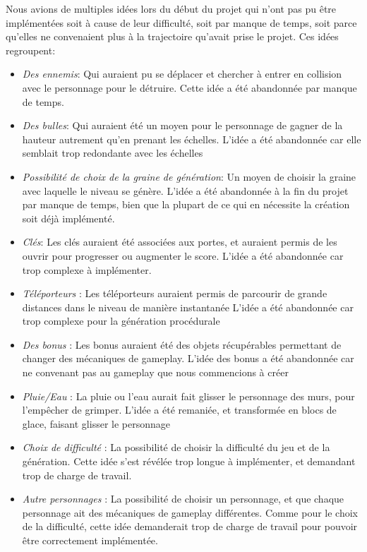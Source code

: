 \documentclass[10pt]{report}
\begin{document}
Nous avions de multiples idées lors du début du projet qui n'ont pas pu être implémentées soit à cause de leur
difficulté, soit par manque de temps, soit parce qu'elles ne convenaient plus  à la trajectoire qu'avait prise le projet.
Ces idées regroupent:
\begin{itemize}
  \item \emph{Des ennemis}: Qui auraient pu se déplacer et chercher à entrer en collision avec le personnage pour le détruire.
        Cette idée a été abandonnée par manque de temps.
  \item \emph{Des bulles}: Qui auraient été un moyen pour le personnage de gagner de la hauteur autrement qu'en prenant les échelles.
        L'idée a été abandonnée car elle semblait trop redondante avec les échelles
  \item \emph{Possibilité de choix de la graine de génération}: Un moyen de choisir la graine avec laquelle le niveau se génère.
        L'idée a été abandonnée à la fin du projet par manque de temps, bien que la plupart de ce qui en nécessite la création soit déjà implémenté.
  \item \emph{Clés}: Les clés auraient été associées aux portes, et auraient permis de les ouvrir pour progresser ou augmenter le score.
        L'idée a été abandonnée car trop complexe à implémenter.
  \item \emph{Téléporteurs} : Les téléporteurs auraient permis de parcourir de grande distances dans le niveau de manière instantanée
        L'idée a été abandonnée car trop complexe pour la génération procédurale
  \item \emph{Des bonus} : Les bonus auraient été des objets récupérables permettant de changer des mécaniques de gameplay.
        L'idée des bonus a été abandonnée car ne convenant pas au gameplay que nous commencions à créer
  \item \emph{Pluie/Eau} : La pluie ou l'eau aurait fait glisser le personnage des murs, pour l'empêcher de grimper.
        L'idée a été remaniée, et transformée en blocs de glace, faisant glisser le personnage
  \item \emph{Choix de difficulté} : La possibilité de choisir la difficulté du jeu et de la génération.
        Cette idée s'est révélée trop longue à implémenter, et demandant trop de charge de travail.
  \item \emph{Autre personnages} : La possibilité de choisir un personnage, et que chaque personnage ait des mécaniques de gameplay différentes.
        Comme pour le choix de la difficulté, cette idée demanderait trop de charge de travail pour pouvoir être correctement implémentée.
\end{itemize}
\end{document}
